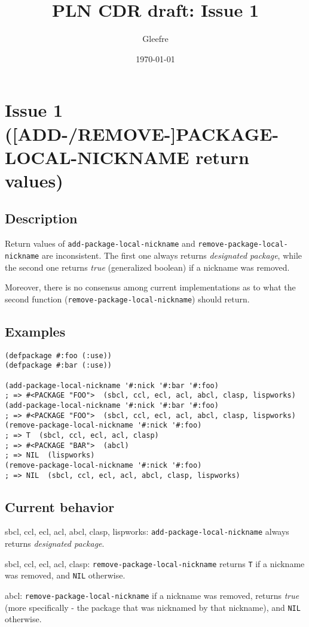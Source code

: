 \documentclass[11pt]{article}
\author{Gleefre}
\date{\today}
\title{PLN CDR draft: Issue 1}
\begin{document}
\maketitle

\section{Issue 1 ([ADD-/REMOVE-]PACKAGE-LOCAL-NICKNAME return values)}
\label{sec:orgc9d8283}
\subsection{Description}
\label{sec:org6c6268c}
Return values of \texttt{add-package-local-nickname} and \texttt{remove-package-local-nickname}
are inconsistent. The first one always returns \emph{designated package}, while the
second one returns \emph{true} (generalized boolean) if a nickname was removed.

Moreover, there is no consensus among current implementations as to what the second
function (\texttt{remove-package-local-nickname}) should return.
\subsection{Examples}
\label{sec:org571c3c8}
\begin{verbatim}
(defpackage #:foo (:use))
(defpackage #:bar (:use))

(add-package-local-nickname '#:nick '#:bar '#:foo)
; => #<PACKAGE "FOO">  (sbcl, ccl, ecl, acl, abcl, clasp, lispworks)
(add-package-local-nickname '#:nick '#:bar '#:foo)
; => #<PACKAGE "FOO">  (sbcl, ccl, ecl, acl, abcl, clasp, lispworks)
(remove-package-local-nickname '#:nick '#:foo)
; => T  (sbcl, ccl, ecl, acl, clasp)
; => #<PACKAGE "BAR">  (abcl)
; => NIL  (lispworks)
(remove-package-local-nickname '#:nick '#:foo)
; => NIL  (sbcl, ccl, ecl, acl, abcl, clasp, lispworks)
\end{verbatim}
\subsection{Current behavior}
\label{sec:org0710ab0}
sbcl, ccl, ecl, acl, abcl, clasp, lispworks:
  \texttt{add-package-local-nickname} always returns \emph{designated package}.

sbcl, ccl, ecl, acl, clasp:
  \texttt{remove-package-local-nickname} returns \texttt{T} if a nickname was removed,
  and \texttt{NIL} otherwise.

abcl:
  \texttt{remove-package-local-nickname} if a nickname was removed, returns \emph{true} (more
  specifically - the package that was nicknamed by that nickname), and \texttt{NIL}
  otherwise.
\end{document}
